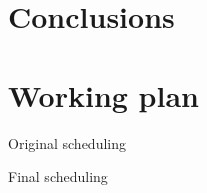 \section{Conclusions}

\section{Working plan}
\begin{frame}{Original scheduling}
\centering
\vspace{1.4em}
\scalebox{0.25}{%

}
\end{frame}

\begin{frame}{Final scheduling}
\centering
\vspace{1.4em}
\scalebox{0.25}{
 
}
\end{frame}








%
%
%
%
%
%
%

%
%
%
%
%
%
%
%
%
%
%
%
%
%
%


